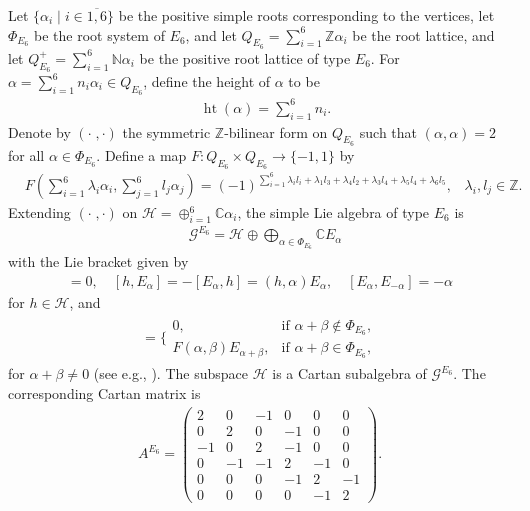\documentclass[12pt]{article}
\numberwithin{equation}{section}
\theoremstyle{definition}
\theoremstyle{remark}
\begin{document}
Let $\{\alpha_i\mid i\in\overline{1,6}\}$ be the positive simple roots corresponding to the vertices, let $\Phi_{E_6}$ be the root system of $E_6$, and let $Q_{E_6}=\sum_{i=1}^6\mathbb{Z}\alpha_i$ be the root lattice, and let $Q_{E_6}^+=\sum_{i=1}^6\mathbb{N}\alpha_i$ be the positive root lattice of type $E_6$. For $\alpha=\sum_{i=1}^6n_i\alpha_i\in Q_{E_6}$, define the height of $\alpha$ to be
\begin{eqnarray}
	&\operatorname{ht}(\alpha)=\sum\limits_{i=1}^6n_i.
\end{eqnarray}
Denote by $(\cdot\;,\cdot)$ the symmetric $\mathbb{Z}$-bilinear form on $Q_{E_6}$ such that $(\alpha,\alpha)=2$ for all $\alpha\in\Phi_{E_6}$. Define a map $F:Q_{E_6}\times Q_{E_6}\longrightarrow\{-1,1\}$ by
\begin{eqnarray}
	&F(\sum\limits_{i=1}^6\lambda_i\alpha_i,\sum\limits_{j=1}^6l_j\alpha_j)=(-1)^{\sum\limits_{i=1}^6\lambda_il_i+\lambda_1l_3+\lambda_4l_2+\lambda_3l_4+\lambda_5l_4+\lambda_6l_5},\;\;\;\lambda_i,l_j\in\mathbb{Z}. \label{2.37}
\end{eqnarray}
Extending $(\cdot\;,\cdot)$ on $\mathscr{H}=\oplus_{i=1}^6\mathbb{C}\alpha_i$, the simple Lie algebra of type $E_6$ is 
\begin{eqnarray}
	&\mathscr{G}^{E_6}=\mathscr{H}\oplus\bigoplus\limits_{\alpha\in\Phi_{E_6}}\mathbb{C}E_{\alpha} \label{2.26}
\end{eqnarray}
with the Lie bracket given by
\begin{eqnarray}
	[\mathscr{H},\mathscr{H}]=0,\quad[h,E_{\alpha}]=-[E_{\alpha},h]=(h,\alpha)E_{\alpha},\quad[E_{\alpha},E_{-\alpha}]=-\alpha \label{Lie}
\end{eqnarray}
for $h\in \mathscr{H}$, and
\begin{eqnarray}
	[E_{\alpha},E_{\beta}]=\Big\{\begin{array}{ll}
		0,&\text{if }\alpha+\beta\notin\Phi_{E_{6}},\\
		F(\alpha,\beta)E_{\alpha+\beta},&\text{if }\alpha+\beta\in\Phi_{E_6},
	\end{array} \label{2.28}
\end{eqnarray}
for $\alpha+\beta\neq0$ (see e.g., \cite{Xu}). The subspace $\mathscr{H}$ is a Cartan subalgebra of $\mathscr{G}^{E_6}$.
The corresponding Cartan matrix is 
\begin{align}
	A^{E_6}=\begin{pmatrix}
		2&0&-1&0&0&0\\
		0&2&0&-1&0&0\\
		-1&0&2&-1&0&0\\
		0&-1&-1&2&-1&0\\
		0&0&0&-1&2&-1\\
		0&0&0&0&-1&2
	\end{pmatrix}. \label{CM}
\end{align}
\end{document}

